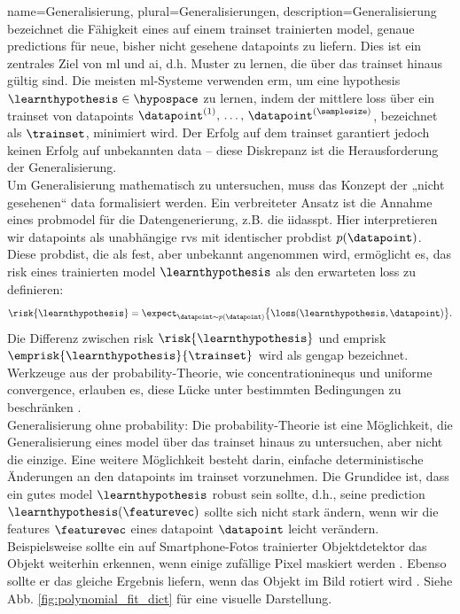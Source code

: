 {{{{
{name={Generalisierung}, plural={Generalisierungen}, 
	description={Generalisierung bezeichnet die Fähigkeit eines auf einem \gls{trainset} trainierten \gls{model}, genaue \glspl{prediction} für neue, bisher nicht gesehene \glspl{datapoint} zu liefern. Dies ist ein zentrales Ziel von \gls{ml} und \gls{ai}, d.h. Muster zu lernen, die über das \gls{trainset} hinaus gültig sind. Die meisten \gls{ml}-Systeme verwenden \gls{erm}, um eine \gls{hypothesis} $\learnthypothesis \in \hypospace$ zu lernen, indem der mittlere \gls{loss} über ein \gls{trainset} von \glspl{datapoint} $\datapoint^{(1)}, \,\ldots, \,\datapoint^{(\samplesize)}$, bezeichnet als $\trainset$, minimiert wird. Der Erfolg auf dem \gls{trainset} garantiert jedoch keinen Erfolg auf unbekannten \gls{data} – diese Diskrepanz ist die Herausforderung der Generalisierung.\\
	Um Generalisierung mathematisch zu untersuchen, muss das Konzept der „nicht gesehenen“ \gls{data} formalisiert werden. Ein verbreiteter Ansatz ist die Annahme eines \gls{probmodel} für die Datengenerierung, z.B. die \gls{iidasspt}. Hier interpretieren wir \glspl{datapoint} als unabhängige \glspl{rv} mit identischer \gls{probdist} $p(\datapoint)$. Diese \gls{probdist}, die als fest, aber unbekannt angenommen wird, ermöglicht es, das \gls{risk} eines trainierten \gls{model} $\learnthypothesis$ als den erwarteten \gls{loss} zu definieren:
	\[
	\risk{\learnthypothesis}=\expect_{\datapoint \sim p(\datapoint)} \big\{ \loss(\learnthypothesis, \datapoint) \big\}.
	\]
	Die Differenz zwischen \gls{risk} $\risk{\learnthypothesis}$ und \gls{emprisk} $\emprisk{\learnthypothesis}{\trainset}$ wird als \gls{gengap} bezeichnet. Werkzeuge aus der \gls{probability}-Theorie, wie \glspl{concentrationinequ} und uniforme \gls{convergence}, erlauben es, diese Lücke unter bestimmten Bedingungen zu beschränken \cite{ShalevMLBook}.\\
	Generalisierung ohne \gls{probability}: Die \gls{probability}-Theorie ist eine Möglichkeit, die Generalisierung eines \gls{model} über das \gls{trainset} hinaus zu untersuchen, aber nicht die einzige. Eine weitere Möglichkeit besteht darin, einfache deterministische Änderungen an den \glspl{datapoint} im \gls{trainset} vorzunehmen. Die Grundidee ist, dass ein gutes \gls{model} $\learnthypothesis$ robust sein sollte, d.h., seine \gls{prediction} $\learnthypothesis(\featurevec)$ sollte sich nicht stark ändern, wenn wir die \glspl{feature} $\featurevec$ eines \gls{datapoint} $\datapoint$ leicht verändern. Beispielsweise sollte ein auf Smartphone-Fotos trainierter Objektdetektor das Objekt weiterhin erkennen, wenn einige zufällige Pixel maskiert werden \cite{OnePixelAttack}. Ebenso sollte er das gleiche Ergebnis liefern, wenn das Objekt im Bild rotiert wird \cite{MallatUnderstandingDeepLearning}. Siehe Abb. \ref{fig:polynomial_fit_dict} für eine visuelle Darstellung.
}}}}}}
